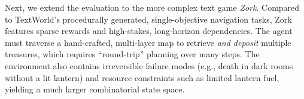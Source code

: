 \documentclass{article}
\begin{document}

Next, we extend the evaluation to the more complex text game \textit{Zork}. Compared to TextWorld's procedurally generated, single-objective navigation tasks, Zork features sparse rewards and high-stakes, long-horizon dependencies. The agent must traverse a hand-crafted, multi-layer map to retrieve \emph{and deposit} multiple treasures, which requires ``round-trip'' planning over many steps. The environment also contains irreversible failure modes (e.g., death in dark rooms without a lit lantern) and resource constraints such as limited lantern fuel, yielding a much larger combinatorial state space.
\end{document}
